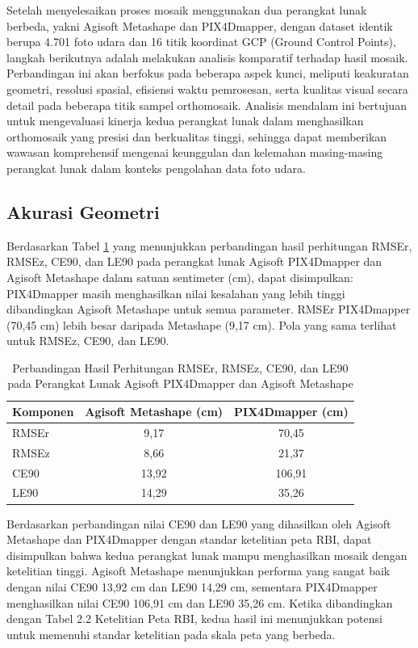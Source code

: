 \par Setelah menyelesaikan proses mosaik menggunakan dua perangkat lunak berbeda, yakni Agisoft Metashape dan PIX4Dmapper, dengan dataset identik berupa 4.701 foto udara dan 16 titik koordinat GCP (Ground Control Points), langkah berikutnya adalah melakukan analisis komparatif terhadap hasil mosaik. Perbandingan ini akan berfokus pada beberapa aspek kunci, meliputi keakuratan geometri, resolusi spasial, efisiensi waktu pemrosesan, serta kualitas visual secara detail pada beberapa titik sampel orthomosaik. Analisis mendalam ini bertujuan untuk mengevaluasi kinerja kedua perangkat lunak dalam menghasilkan orthomosaik yang presisi dan berkualitas tinggi, sehingga dapat memberikan wawasan komprehensif mengenai keunggulan dan kelemahan masing-masing perangkat lunak dalam konteks pengolahan data foto udara.

\subsection{Akurasi Geometri}

Berdasarkan Tabel \ref{tab:perbandingan} yang menunjukkan perbandingan hasil perhitungan RMSEr, RMSEz, CE90, dan LE90 pada perangkat lunak Agisoft PIX4Dmapper dan Agisoft Metashape dalam satuan sentimeter (cm), dapat disimpulkan:
PIX4Dmapper masih menghasilkan nilai kesalahan yang lebih tinggi dibandingkan Agisoft Metashape untuk semua parameter. RMSEr PIX4Dmapper (70,45 cm) lebih besar daripada Metashape (9,17 cm). Pola yang sama terlihat untuk RMSEz, CE90, dan LE90.

\begin{table}[H]
\centering
\begin{tabular}{|l|c|c|}
\hline
\textbf{Komponen} & \textbf{Agisoft Metashape (cm)} & \textbf{PIX4Dmapper (cm)} \\
\hline
RMSEr  & 9,17 & 70,45 \\
RMSEz  & 8,66 & 21,37 \\
CE90  & 13,92 & 106,91 \\
LE90  & 14,29 & 35,26 \\
\hline
\end{tabular}
\caption{Perbandingan Hasil Perhitungan RMSEr, RMSEz, CE90, dan LE90 pada Perangkat Lunak Agisoft PIX4Dmapper dan Agisoft Metashape}
\label{tab:perbandingan}
\end{table}

Berdasarkan perbandingan nilai CE90 dan LE90 yang dihasilkan oleh Agisoft Metashape dan PIX4Dmapper dengan standar ketelitian peta RBI, dapat disimpulkan bahwa kedua perangkat lunak mampu menghasilkan mosaik dengan ketelitian tinggi. Agisoft Metashape menunjukkan performa yang sangat baik dengan nilai CE90 13,92 cm dan LE90 14,29 cm, sementara PIX4Dmapper menghasilkan nilai CE90 106,91 cm dan LE90 35,26 cm. Ketika dibandingkan dengan Tabel 2.2 Ketelitian Peta RBI, kedua hasil ini menunjukkan potensi untuk memenuhi standar ketelitian pada skala peta yang berbeda.

